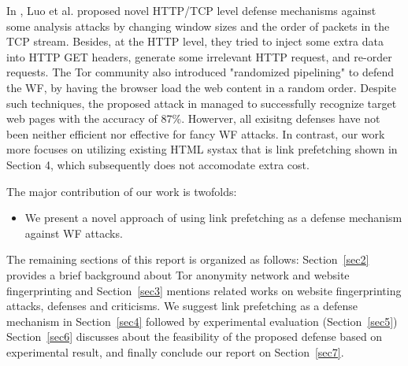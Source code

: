 In \cite{luo2011}, Luo et al. proposed novel HTTP/TCP level defense mechanisms against some analysis attacks by changing window sizes and the order of packets in the TCP stream.
Besides, at the HTTP level, they tried to inject some extra data into HTTP GET headers, generate some irrelevant HTTP request, and re-order requests.
The Tor community also introduced "randomized pipelining" \cite{perry11} to defend the WF, by having the browser load the web content in a random order.
Despite such techniques, the proposed attack in \cite{cai2012touching} managed to successfully recognize target web pages with the accuracy of 87\%. 
Howerver, all exisitng defenses have not been neither efficient nor effective for fancy WF attacks. %
In contrast, our work more focuses on utilizing existing HTML systax that is link prefetching shown in Section 4, which subsequently does not accomodate extra cost.



The major contribution of our work is twofolds:
\begin{itemize}
\item
We present a novel approach of using link prefetching as a defense mechanism against WF attacks.
\end{itemize}

The remaining sections of this report is organized as follows: Section~\ref{sec2} provides a brief background about Tor anonymity network and website fingerprinting and Section~\ref{sec3} mentions related works on website fingerprinting attacks, defenses and criticisms.
We suggest link prefetching as a defense mechanism in Section~\ref{sec4} followed by experimental evaluation (Section~\ref{sec5})
Section~\ref{sec6} discusses about the feasibility of the proposed defense based on experimental result, and finally conclude our report on Section~\ref{sec7}.

